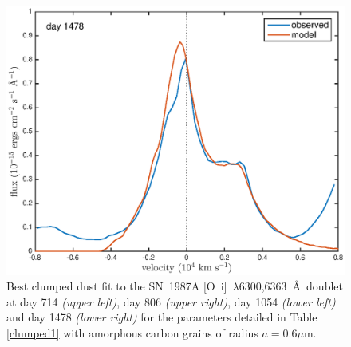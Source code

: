 \documentclass[useAMS,usenatbib,usegraphicx]{mnras}
\begin{document}
\begin{figure}
\begin{center}
\includegraphics[trim =33 10 45 15,clip=true,scale=0.47]{clump_1/best_fit/d1478OI}
\caption{Best clumped dust fit to the SN~1987A [O~{\sc i}]~$\lambda$6300,6363~\AA\ doublet at day 714 \textit{(upper left)}, day 806 \textit{(upper right)}, day 1054 \textit{(lower left)} and day 1478 \textit{(lower right)} for the parameters detailed in Table \ref{clumped1} with amorphous carbon grains of radius $a=0.6 \mu$m.}
\label{OI_clump1}
\end{center}
\end{figure}
\end{document}
